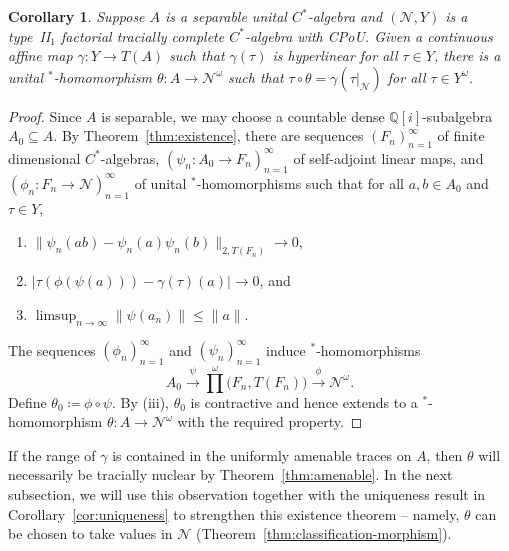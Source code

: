 \documentclass[a4paper,11pt]{amsart}
\newtheorem{corollary}[theorem]{Corollary}
\theoremstyle{definition}
\numberwithin{equation}{section}
\numberwithin{theorem}{section}
\begin{document}
\begin{corollary}
	\label{cor:existence}
	Suppose $A$ is a separable unital $C^*$-algebra and $(\mathcal N, Y)$ is a type~{\rm II}$_1$ factorial tracially complete $C^*$-algebra with CPoU.  Given a continuous affine map $\gamma \colon Y \rightarrow T(A)$ such that $\gamma(\tau)$ is hyperlinear for all $\tau \in Y$, there is a unital $^*$-homomorphism $\theta \colon A \rightarrow \mathcal N^\omega$ such that $\tau \circ \theta = \gamma(\tau|_\mathcal N)$ for all $\tau \in Y^\omega$.
\end{corollary}

\begin{proof}
	Since $A$ is separable, we may choose a countable dense $\mathbb Q[i]$-subalgebra $A_0 \subseteq A$.  By Theorem~\ref{thm:existence}, there are sequences $(F_n)_{n=1}^\infty$ of finite dimensional $C^*$-algebras, $(\psi_n \colon A_0 \rightarrow F_n)_{n=1}^\infty$ of self-adjoint linear maps, and $(\phi_n \colon F_n \rightarrow \mathcal N)_{n=1}^\infty$ of unital $^*$-homomorphisms such that for all $a, b \in A_0$ and $\tau \in Y$,
	\begin{enumerate}
		\item $\|\psi_n(ab) - \psi_n(a)\psi_n(b)\|_{2, T(F_n)} \rightarrow 0$,
		\item $|\tau(\phi(\psi(a))) - \gamma(\tau)(a)| \rightarrow 0$, and
		\item $\displaystyle\limsup_{n \rightarrow \infty} \|\psi(a_n)\| \leq \|a\|$.
	\end{enumerate}
	The sequences $(\phi_n)_{n=1}^\infty$ and $(\psi_n)_{n=1}^\infty$ induce $^*$-homomorphisms
	\begin{equation}
		A_0 \xrightarrow{\psi} \prod^\omega \big(F_n, T(F_n)\big) \xrightarrow{\phi} \mathcal N^\omega.
	\end{equation}
	Define $\theta_0 \coloneqq \phi \circ \psi$.  By (iii), $\theta_0$ is contractive and hence extends to a $^*$-homomorphism $\theta \colon A \rightarrow \mathcal N^\omega$ with the required property.
\end{proof}

If the range of $\gamma$ is contained in the uniformly amenable traces on $A$, then $\theta$ will necessarily be tracially nuclear by Theorem~\ref{thm:amenable}.  In the next subsection, we will use this observation together with the uniqueness result in Corollary~\ref{cor:uniqueness} to strengthen this existence theorem -- namely, $\theta$ can be chosen to take values in $\mathcal N$ (Theorem~\ref{thm:classification-morphism}).
\end{document}
